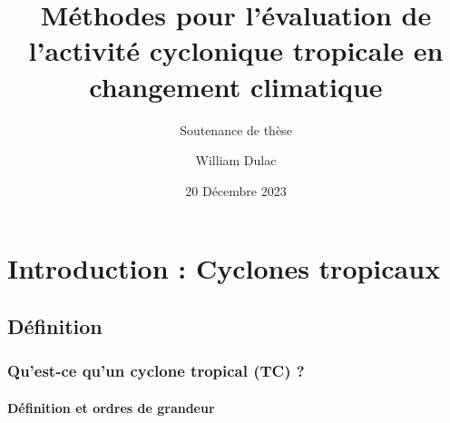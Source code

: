 \documentclass[aspectratio=169, usepdftitle=false, xcolor={dvipsnames}, 9pt]{beamer}
\title{Méthodes pour l'évaluation de l'activité cyclonique tropicale en changement climatique}
\author[William]{William Dulac}
\subtitle{Soutenance de thèse}
\institute{Centre National de Recherches Météorologiques}
\date{20 Décembre 2023}
\begin{document}
\maketitle

\section[Introduction]{Introduction : Cyclones tropicaux}

\makesecslide

\subsection{Définition}

\begin{frame}[t]
    \renewcommand*{\thefootnote}{\fnsymbol{footnote}}
    \frametitle{Qu'est-ce qu'un cyclone tropical (TC) ?}
    \framesubtitle{Définition et ordres de grandeur}


\end{frame}
\end{document}
